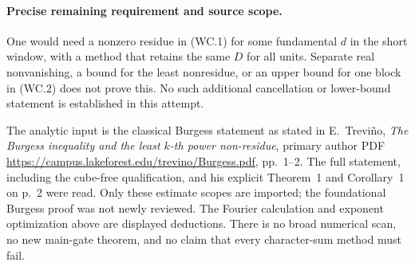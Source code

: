 \paragraph{Precise remaining requirement and source scope.}
One would need a nonzero residue in (WC.1) for some
fundamental $d$ in the short window, with a method that
retains the same $D$ for all units.  Separate real
nonvanishing, a bound for the least nonresidue, or an
upper bound for one block in (WC.2) does not prove this.
No such additional cancellation or lower-bound statement
is established in this attempt.

The analytic input is the classical Burgess statement
as stated in E.~Trevi\~no, \emph{The Burgess inequality
and the least $k$-th power non-residue}, primary author
PDF \url{https://campus.lakeforest.edu/trevino/Burgess.pdf},
pp.~1--2.  The full statement, including the cube-free
qualification, and his explicit Theorem~1 and Corollary~1
on p.~2 were read.  Only these estimate scopes are
imported; the foundational Burgess proof was not newly
reviewed.  The Fourier calculation and exponent
optimization above are displayed deductions.
There is no broad numerical scan, no new main-gate
theorem, and no claim that every character-sum method
must fail.
